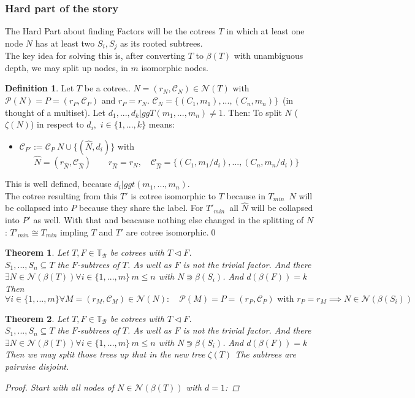 \documentclass[a4paper,12pt]{article}
\newtheorem{theorem}{Theorem}[section]
\theoremstyle{definition}
\newtheorem{definition}{Definition}[section]
\begin{document}
		\subsubsection{Hard part of the story}
		The Hard Part about finding Factors will be the cotrees $T$ in which at least one node $N$ has at least two $S_i, S_j$ as its rooted subtrees.\\
		The key idea for solving this is, after converting $T$ to $\beta(T)$ with unambiguous depth, we may split up nodes, in $m$ isomorphic nodes. 
		\begin{definition}
			Let $T$ be a cotree.. $N=(r_N,\mathcal{C}_N)\in \mathcal{N}(T)$ with $\mathcal{P}(N)=P=(r_P,\mathcal{C}_P)$ and $r_P=r_N$. $\mathcal{C}_N=\{(C_1,m_1),...,(C_n,m_n)\}\, $ (in thought of a multiset). Let $d_1,...,d_k \big| ggT(m_1,...,m_n)\not= 1$. Then:
			To split $N$ ($\zeta(N)$) in respect to $d_i,\,\, i \in\{1,...,k\}$ means:
			\begin{itemize}
				\item $\mathcal{C}_{P'} := \mathcal{C}_P\ N \cup \{(\hat{N},d_i )\}$ with
				\[\hat{N}=(r_{\hat{N}}, \mathcal{C}_{\hat{N}})\qquad r_{\hat{N}}=r_N,\quad \mathcal{C}_{\hat{N}}=\{(C_1,m_1/d_i),...,(C_n,m_n/d_i)\}\]
			\end{itemize} 
			This is well defined, because $d_i \big | ggt(m_1,...,m_n)$.\\ The cotree resulting from this $T'$ is cotree isomorphic to $T$ because in $T_{min}\,$ $N$ will be collapsed into $P$ because they share the label. For $T'_{min}\,$ all $\hat{N}$ will be collapsed into $P'$ as well. With that and beacause nothing else changed in the splitting of $N$: $T'_{min}\cong T_{min}$ impling $T$ and $T'$ are cotree isomorphic.\qed
		\end{definition}
	\begin{theorem}
			Let $T,F\in\mathds{T}_{\mathcal{B}} $ be cotrees with $T\vartriangleleft F$.\\ 	$S_1,...,S_n\subseteq T$ the $F$-subtrees of $T$. As well as $F$ is not the trivial 		factor. And there $\exists N\in\mathcal{N}(\beta(T)) \forall i\in \{1,...,m\}\, m\leq 	n$ with $N\Supset \beta(S_i)$. And $d(\beta(F))=k$\\
			Then 
			\[\forall i \in \{1,...,m\}\forall M=(r_M, \mathcal{C}_M)\in \mathcal{N}(N):\quad \mathcal{P}(M) = P=(r_P,\mathcal{C}_P)\text{ with } r_P=r_M \implies N\in \mathcal{N}(\beta(S_i))\]			
		\end{theorem}
		\begin{theorem}
				Let $T,F\in\mathds{T}_{\mathcal{B}} $ be cotrees with $T\vartriangleleft F$.\\ $S_1,...,S_n\subseteq T$ the $F$-subtrees of $T$. As well as $F$ is not the trivial factor. And there $\exists N\in\mathcal{N}(\beta(T)) \forall i\in \{1,...,m\}\, m\leq n$ with $N\Supset \beta(S_i)$. And $d(\beta(F))=k$\\
				Then we may split those trees up that in the new tree $\zeta (T)$ The subtrees are pairwise disjoint.
				\begin{proof}
					Start with all nodes of $N\in \mathcal{N}(\beta(T))$ with $d=1$:
				\end{proof}				
		\end{theorem}
		
\end{document}
